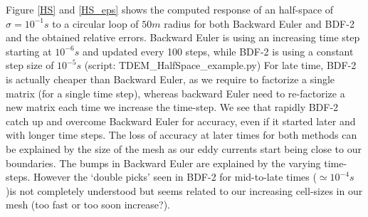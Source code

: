 \documentclass[twoside]{article}
\begin{document}
Figure \ref{HS} and \ref{HS_eps} shows the computed response of an half-space of $\sigma = 10^{-1}s$ to a circular loop of $50m$ radius for both Backward Euler and BDF-2 and the obtained relative errors. Backward Euler is using an increasing time step starting at $10^{-6}s$ and updated every 100 steps, while BDF-2 is using a constant step size of $10^{-5}s$ (script: TDEM\_HalfSpace\_example.py)
For late time, BDF-2 is actually cheaper than Backward Euler, as we require to factorize a single matrix (for a single time step), whereas backward Euler need to re-factorize a new matrix each time we increase the time-step. We see that rapidly BDF-2 catch up and overcome Backward Euler for accuracy, even if it started later and with longer time steps. The loss of accuracy at later times for both methods can be explained by the size of the mesh as our eddy currents start being close to our boundaries. The bumps in Backward Euler are explained by the varying time-steps. However the `double picks' seen in BDF-2 for mid-to-late times ($\simeq 10^{-4}s$)is not completely understood but seems related to our increasing cell-sizes in our mesh (too fast or too soon increase?).
\end{document}
